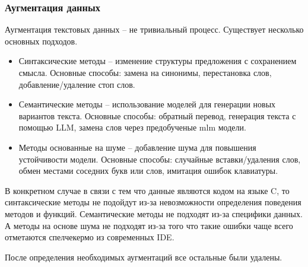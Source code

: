 \documentclass[../part_2.tex]{subfiles}
\begin{document}
    \subsubsection{Аугментация данных}
    \par Аугментация текстовых данных -- не тривиальный процесс. Существует несколько основных подходов.
    \begin{itemize}
        \item Синтаксические методы -- изменение структуры предложения с сохранением смысла. Основные способы: замена на синонимы, перестановка слов, добавление/удаление стоп слов.
        \item Семантические методы -- использование моделей для генерации новых вариантов текста. Основные способы: обратный перевод, генерация текста с помощью LLM, замена слов через предобученые \acrshort{mlm} модели.
        \item Методы основанные на шуме -- добавление шума для повышения устойчивости модели. Основные способы: случайные вставки/удаления слов, обмен местами соседних букв или слов, имитация ошибок клавиатуры.
    \end{itemize}
    \par В конкретном случае в связи с тем что данные являются кодом на языке C, то синтаксические методы не подойдут из-за невозможности определения поведения методов и функций. Семантические методы не подходят из-за специфики данных. А методы на основе шума не подходят из-за того что такие ошибки чаще всего отметаются спелчекермо из современных IDE.

    \par После определения необходимых аугментаций все остальные были удалены.
\end{document}
